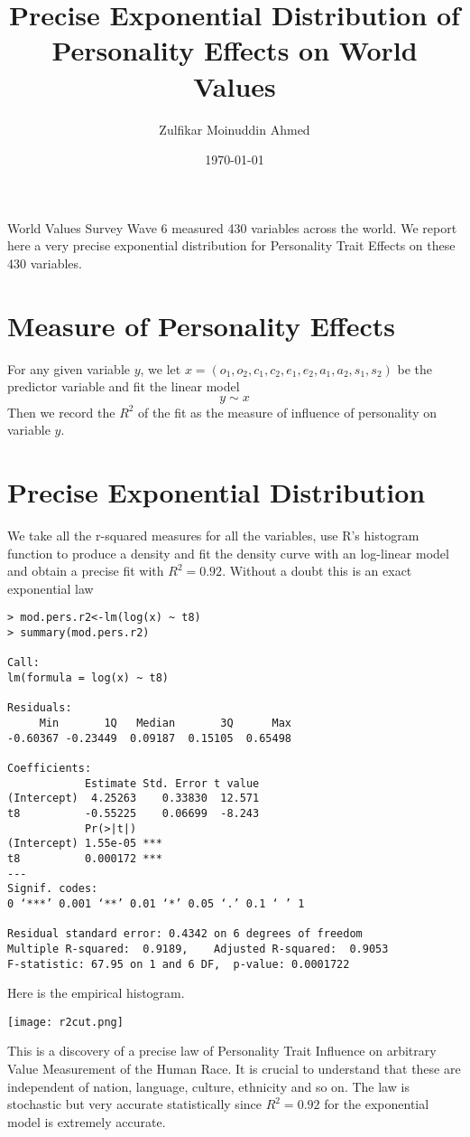 \documentclass{amsart}
\title{Precise Exponential Distribution of Personality Effects on World Values}
\author{Zulfikar Moinuddin Ahmed}
\date{\today}
\begin{document}
\maketitle

World Values Survey Wave 6 measured 430 variables across the world. We report here a very precise exponential distribution for Personality Trait Effects on these 430 variables.

\section{Measure of Personality Effects}

For any given variable $y$, we let $x=(o_1, o_2, c_1, c_2, e_1, e_2, a_1, a_2, s_1, s_2)$ be the predictor variable and fit the linear model
\[
y \sim x 
\]
Then we record the $R^2$ of the fit as the measure of influence of personality on variable $y$.

\section{Precise Exponential Distribution}

We take all the r-squared measures for all the variables, use R's histogram function to produce a density and fit the density curve with an log-linear model and obtain a precise fit with $R^2=0.92$.  Without a doubt this is an exact exponential law
\begin{verbatim}
> mod.pers.r2<-lm(log(x) ~ t8)
> summary(mod.pers.r2)

Call:
lm(formula = log(x) ~ t8)

Residuals:
     Min       1Q   Median       3Q      Max 
-0.60367 -0.23449  0.09187  0.15105  0.65498 

Coefficients:
            Estimate Std. Error t value
(Intercept)  4.25263    0.33830  12.571
t8          -0.55225    0.06699  -8.243
            Pr(>|t|)    
(Intercept) 1.55e-05 ***
t8          0.000172 ***
---
Signif. codes:  
0 ‘***’ 0.001 ‘**’ 0.01 ‘*’ 0.05 ‘.’ 0.1 ‘ ’ 1

Residual standard error: 0.4342 on 6 degrees of freedom
Multiple R-squared:  0.9189,	Adjusted R-squared:  0.9053 
F-statistic: 67.95 on 1 and 6 DF,  p-value: 0.0001722
\end{verbatim}

Here is the empirical histogram.

\texttt{[image: r2cut.png]}

This is a discovery of a precise law of Personality Trait Influence on arbitrary Value Measurement of the Human Race. It is crucial to understand that these are independent of nation, language, culture, ethnicity and so on.  The law is stochastic but very accurate statistically since $R^2=0.92$ for the exponential model is extremely accurate.  
\end{document}
